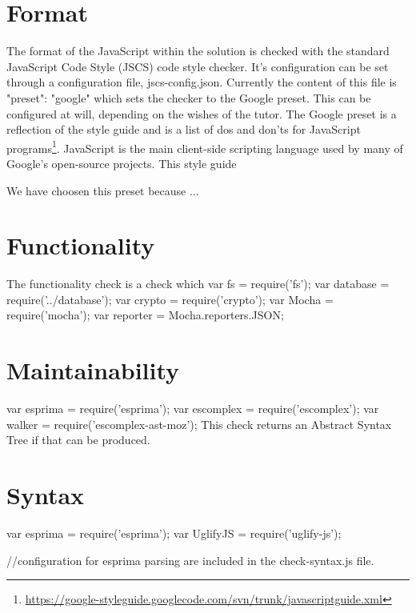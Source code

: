% 


\section{Format}

The format of the JavaScript within the solution is checked with the standard
JavaScript Code Style (JSCS) code style checker.
It's configuration can be set through a configuration file, jscs-config.json.
Currently the content of this file is {"preset": "google"} which sets the checker
to the Google preset.
This can be configured at will, depending on the wishes of the tutor.
The Google preset is a reflection of the style guide and is a list of dos and
don'ts for JavaScript
programs\footnote{\url{https://google-styleguide.googlecode.com/svn/trunk/javascriptguide.xml}}.
JavaScript is the main client-side scripting language used by many of Google's
open-source projects. This style guide 

We have choosen this preset because ...



\section{Functionality}

The functionality check is a check which 
var fs = require('fs');
var database = require('../database');
var crypto = require('crypto');
var Mocha = require('mocha');
var reporter = Mocha.reporters.JSON;






\section{Maintainability}
var esprima = require('esprima');
var escomplex = require('escomplex');
var walker = require('escomplex-ast-moz');
This check returns an Abstract Syntax Tree if that can be produced.


\section{Syntax}
var esprima = require('esprima');
var UglifyJS = require('uglify-js');

//configuration for esprima parsing are included in the check-syntax.js file.

